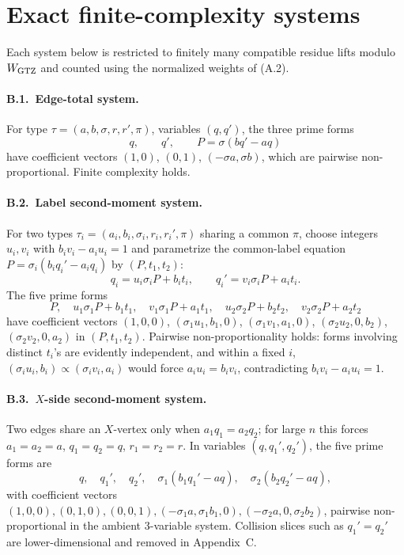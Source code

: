 \documentclass[11pt]{article}
\begin{document}
\section{Exact finite-complexity systems}

Each system below is restricted to finitely many compatible residue lifts
modulo \(W_{\rm GTZ}\) and counted using the normalized weights of (A.2).

\paragraph{B.1.\ Edge-total system.}
For type \(\tau=(a,b,\sigma,r,r',\pi)\), variables \((q,q')\), the three
prime forms
\[
  q,\qquad q',\qquad P=\sigma(bq'-aq)
  \tag{B.1}
\]
have coefficient vectors \((1,0)\), \((0,1)\), \((-\sigma a,\sigma b)\),
which are pairwise non-proportional.  Finite complexity holds.

\paragraph{B.2.\ Label second-moment system.}
For two types \(\tau_i=(a_i,b_i,\sigma_i,r_i,r_i',\pi)\) sharing a common
\(\pi\), choose integers \(u_i,v_i\) with \(b_iv_i-a_iu_i=1\) and parametrize
the common-label equation \(P=\sigma_i(b_iq_i'-a_iq_i)\) by \((P,t_1,t_2)\):
\[
  q_i=u_i\sigma_iP+b_it_i,\qquad
  q_i'=v_i\sigma_iP+a_it_i.
\]
The five prime forms
\[
  P,\quad u_1\sigma_1P+b_1t_1,\quad v_1\sigma_1P+a_1t_1,\quad
  u_2\sigma_2P+b_2t_2,\quad v_2\sigma_2P+a_2t_2
  \tag{B.7}
\]
have coefficient vectors
\(
  (1,0,0)
\), \(
  (\sigma_1u_1,b_1,0)
\), \(
  (\sigma_1v_1,a_1,0)
\), \(
  (\sigma_2u_2,0,b_2)
\), \(
  (\sigma_2v_2,0,a_2)
\)
in \((P,t_1,t_2)\).  Pairwise non-proportionality holds: forms involving
distinct \(t_i\)'s are evidently independent, and within a fixed \(i\),
\((\sigma_iu_i,b_i)\propto(\sigma_iv_i,a_i)\) would force
\(a_iu_i=b_iv_i\), contradicting \(b_iv_i-a_iu_i=1\).

\paragraph{B.3.\ \(X\)-side second-moment system.}
Two edges share an \(X\)-vertex only when \(a_1q_1=a_2q_2\); for large \(n\)
this forces \(a_1=a_2=a\), \(q_1=q_2=q\), \(r_1=r_2=r\).  In variables
\((q,q_1',q_2')\), the five prime forms are
\[
  q,\quad q_1',\quad q_2',\quad
  \sigma_1(b_1q_1'-aq),\quad
  \sigma_2(b_2q_2'-aq),
  \tag{B.13}
\]
with coefficient vectors
\(
  (1,0,0),(0,1,0),(0,0,1),(-\sigma_1a,\sigma_1b_1,0),(-\sigma_2a,0,\sigma_2b_2)
\),
pairwise non-proportional in the ambient 3-variable system.  Collision
slices such as \(q_1'=q_2'\) are lower-dimensional and removed in
Appendix~C.
\end{document}
